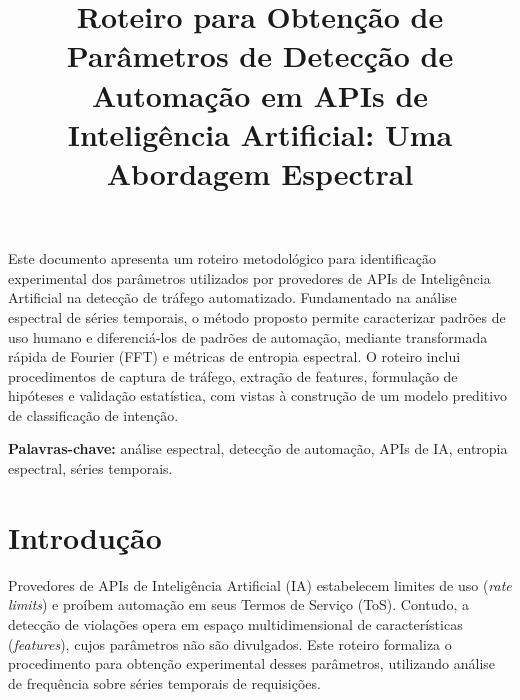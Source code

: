 \documentclass[12pt,openright,oneside,a4paper]{abntex2}
\title{Roteiro para Obtenção de Parâmetros de Detecção de Automação em APIs de Inteligência Artificial: Uma Abordagem Espectral}
\begin{document}
\imprimircapa
\imprimirfolhaderosto*

\begin{fichacatalografica}
\vspace*{\fill}
\begin{center}
\end{center}
\end{fichacatalografica}

\begin{resumo}
Este documento apresenta um roteiro metodológico para identificação experimental dos parâmetros utilizados por provedores de APIs de Inteligência Artificial na detecção de tráfego automatizado. Fundamentado na análise espectral de séries temporais, o método proposto permite caracterizar padrões de uso humano e diferenciá-los de padrões de automação, mediante transformada rápida de Fourier (FFT) e métricas de entropia espectral. O roteiro inclui procedimentos de captura de tráfego, extração de features, formulação de hipóteses e validação estatística, com vistas à construção de um modelo preditivo de classificação de intenção.

\textbf{Palavras-chave:} análise espectral, detecção de automação, APIs de IA, entropia espectral, séries temporais.
\end{resumo}

\sumario

\chapter{Introdução}

Provedores de APIs de Inteligência Artificial (IA) estabelecem limites de uso (\textit{rate limits}) e proíbem automação em seus Termos de Serviço (ToS). Contudo, a detecção de violações opera em espaço multidimensional de características (\textit{features}), cujos parâmetros não são divulgados. Este roteiro formaliza o procedimento para obtenção experimental desses parâmetros, utilizando análise de frequência sobre séries temporais de requisições.
\end{document}
